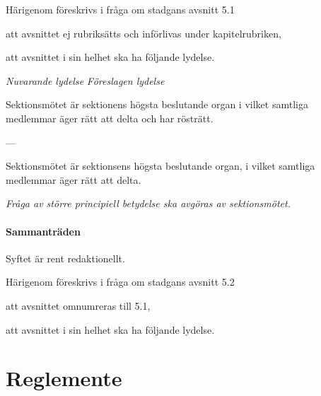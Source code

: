 \documentclass{article}
\newenvironment{lydelse}
    {\begin{paracol}{2}%
        \emph{Nuvarande lydelse}%
        \switchcolumn%
        \emph{Föreslagen lydelse}%
    \end{paracol}%
    \begin{enumerate}[label=\thesubsection.\arabic*]%
    \begin{paracol}{2}%
    }{\end{paracol}\end{enumerate}}
\begin{document}
Härigenom föreskrivs i fråga om stadgans avsnitt 5.1
\begin{dels}
  \item att avsnittet ej rubriksätts och införlivas under kapitelrubriken,
  \item att avsnittet i sin helhet ska ha följande lydelse.
\end{dels}

\begin{lydelse}
  \setcounter{subsection}{1}
    \item Sektionsmötet är sektionens högsta beslutande organ i vilket samtliga
      medlemmar äger rätt att delta och har rösträtt.

    \item[] ---
  \switchcolumn
  \setcounter{subsection}{0}
    \item Sektionsmötet är sektionsens högsta beslutande organ, i vilket
      samtliga medlemmar äger rätt att delta.

    \item \emph{Fråga av större principiell betydelse ska avgöras av
        sektionsmötet.}

\end{lydelse}

\setcounter{subsection}{0}
\subsection{Sammanträden}
Syftet är rent redaktionellt.

Härigenom föreskrivs i fråga om stadgans avsnitt 5.2
\begin{dels}
  \item att avsnittet omnumreras till 5.1,
  \item att avsnittet i sin helhet ska ha följande lydelse.
  \end{dels}



\clearpage
\part{Reglemente}
\end{document}
